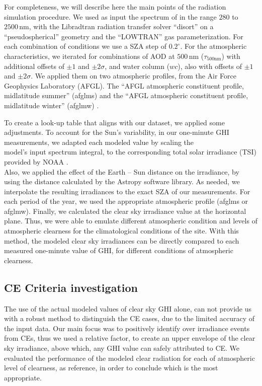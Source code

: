 \documentclass[preprint, 3p,
authoryear]{elsarticle} %
\begin{document}
For completeness, we will describe here the main points of the radiation
simulation procedure. We used as input the spectrum of
\citet{Kurucz1994} in the range \(280\) to \(2500\,\text{nm}\), with the
Libradtran radiation transfer solver ``disort'' on a ``pseudospherical''
geometry and the ``LOWTRAN'' gas parameterization. For each combination
of conditions we use a SZA step of \(0.2^\circ\). For the atmospheric
characteristics, we iterated for combinations of AOD at
\(500\,\text{nm}\) (\(\tau_{500\text{nm}}\)) with additional offsets of
\(\pm1\) and \(\pm2\sigma\), and water column (\(wc\)), also with
offsets of \(\pm1\) and \(\pm2\sigma\). We applied them on two
atmospheric profiles, from the Air Force Geophysics Laboratory (AFGL).
The ``AFGL atmospheric constituent profile, midlatitude summer''
(afglms) and the ``AFGL atmospheric constituent profile, midlatitude
winter'' (afglmw) \citep{Anderson1986}.

To create a look-up table that aligns with our dataset, we applied some
adjustments. To account for the Sun's variability, in our one-minute GHI
measurements, we adapted each modeled value by scaling the\\
model's input spectrum integral, to the corresponding total solar
irradiance (TSI) provided by NOAA \citep{Coddington2005}.\\
Also, we applied the effect of the Earth -- Sun distance on the
irradiance, by using the distance calculated by the Astropy
\citep{AstropyCollaboration2022} software library. As needed, we
interpolate the resulting irradiances to the exact SZA of our
measurements. For each period of the year, we used the appropriate
atmospheric profile (afglms or afglmw). Finally, we calculated the clear
sky irradiance value at the horizontal plane. Thus, we were able to
emulate different atmospheric condition and levels of atmospheric
clearness for the climatological conditions of the site. With this
method, the modeled clear sky irradiances can be directly compared to
each measured one-minute value of GHI, for different conditions of
atmospheric clearness.

\hypertarget{ce-criteria-investigation}{%
\subsection{CE Criteria investigation}\label{ce-criteria-investigation}}

The use of the actual modeled values of clear sky GHI alone, can not
provide us with a robust method to distinguish the CE cases, due to the
limited accuracy of the input data. Our main focus was to positively
identify over irradiance events from CEs, thus we used a relative
factor, to create an upper envelope of the clear sky irradiance, above
which, any GHI value can safely attributed to CE. We evaluated the
performance of the modeled clear radiation for each of atmospheric level
of clearness, as reference, in order to conclude which is the most
appropriate.
\end{document}
